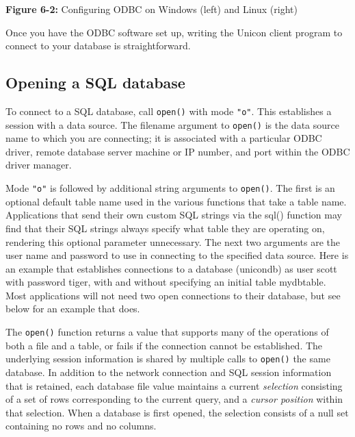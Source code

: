 {\sffamily\bfseries Figure 6-2:}
{\sffamily Configuring ODBC on Windows (left) and Linux (right)}

\bigskip


Once you have the ODBC software set up,
writing the Unicon client program to connect to your database is
straightforward.

\subsection*{Opening a SQL database}

To connect to a SQL database, call \texttt{open()} with mode
\texttt{"o"}. This establishes a session with a data source. The
filename argument to \texttt{open()} is the data source name to which
you are connecting; it is associated with a particular ODBC driver,
remote database server machine or IP number, and port within the ODBC
driver manager.

Mode \texttt{"o"} is followed by additional string arguments to
\texttt{open()}. The first is an optional default table name used in
the various functions that take a table name.  Applications that send
their own custom SQL strings via the sql() function may find that
their SQL strings always specify what table they are operating on,
rendering this optional parameter unnecessary.  The next two arguments
are the user name and password to use in connecting to the specified
data source. Here is an example that establishes connections to a
database (unicondb) as user scott with password tiger, with and
without specifying an initial table mydbtable.  Most applications
will not need two open connections to their database, but see below
for an example that does.


The \texttt{open()} function returns a value that supports many of the
operations of both a file and a table, or fails if the connection
cannot be established. The underlying session information is shared by
multiple calls to \texttt{open()} the same database. In addition to
the network connection and SQL session information that is retained,
each database file value maintains a current \textit{selection}
consisting of a set of rows corresponding to the current query, and a
\textit{cursor position} within that selection. When a database is
first opened, the selection consists of a null set containing no rows
and no columns.

